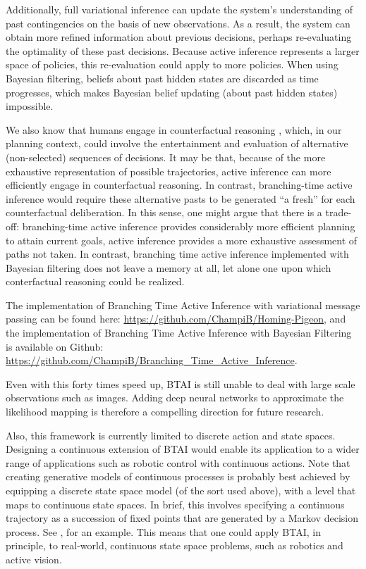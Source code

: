 \documentclass[twoside,11pt]{article}
\begin{document}
Additionally, full variational inference can update the system's understanding of past contingencies on the basis of new observations. As a result, the system can obtain more refined information about previous decisions, perhaps re-evaluating the optimality of these past decisions. Because active inference represents a larger space of policies, this re-evaluation could apply to more policies. When using Bayesian filtering, beliefs about past hidden states are discarded as time progresses, which makes Bayesian belief updating (about past hidden states) impossible.

We also know that humans engage in counterfactual reasoning \citep{rafetseder2013counterfactual}, which, in our planning context, could involve the entertainment and evaluation of alternative (non-selected) sequences of decisions. It may be that, because of the more exhaustive representation of possible trajectories, active inference can more efficiently engage in counterfactual reasoning. In contrast, branching-time active inference would require these alternative pasts to be generated ``a fresh'' for each counterfactual deliberation. In this sense, one might argue that there is a trade-off: branching-time active inference provides considerably more efficient planning to attain current goals, active inference provides a more exhaustive assessment of paths not taken. In contrast, branching time active inference implemented with Bayesian filtering does not leave a memory at all, let alone one upon which conterfactual reasoning could be realized.

The implementation of Branching Time Active Inference with variational message passing can be found here: \url{https://github.com/ChampiB/Homing-Pigeon}, and the implementation of Branching Time Active Inference with Bayesian Filtering is available on Github: \url{https://github.com/ChampiB/Branching\_Time\_Active\_Inference}.

Even with this forty times speed up, BTAI is still unable to deal with large scale observations such as images. Adding deep neural networks to approximate the likelihood mapping is therefore a compelling direction for future research.

Also, this framework is currently limited to discrete action and state spaces. Designing a continuous extension of BTAI would enable its application to a wider range of applications such as robotic control with continuous actions. Note that creating generative models of continuous processes is probably best achieved by equipping a discrete state space model (of the sort used above), with a level that maps to continuous state spaces. In brief, this involves specifying a continuous trajectory as a succession of fixed points that are generated by a Markov decision process. See \citet{believe}, for an example. This means that one could apply BTAI, in principle, to real-world, continuous state space problems, such as robotics and active vision.
\end{document}
